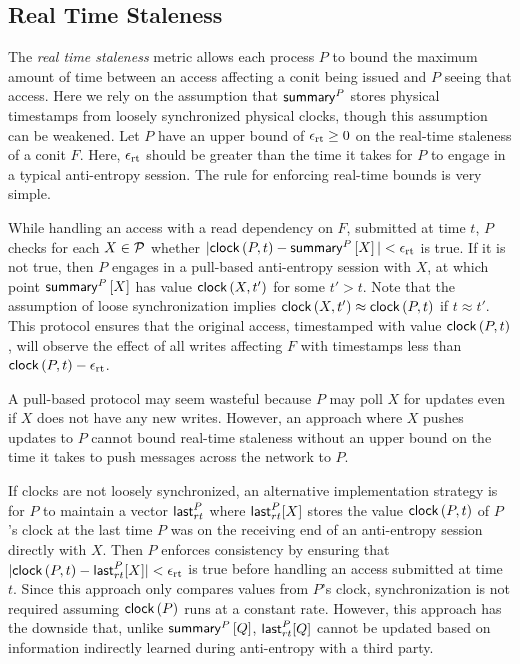 \documentclass[]             %
{NASA}                       %
\theoremstyle{definition}
\begin{document}
\subsection{Real Time Staleness}
\label{ssec:conit-real-time-consistency}
The \emph{real time staleness} metric allows each process $P$ to bound
the maximum amount of time between an access affecting a conit being
issued and $P$ seeing that access. Here we rely on the assumption that
$\mathsf{summary}^{P}$ stores physical timestamps from loosely synchronized
physical clocks, though this assumption can be weakened. Let $P$ have
an upper bound of $\epsilon_{\textrm{rt}} \geq 0$ on the real-time staleness of a conit
$F$. Here, $\epsilon_{\textrm{rt}}$ should be greater than the time it takes for $P$ to
engage in a typical anti-entropy session. The rule for enforcing
real-time bounds is very simple.

While handling an access with a read dependency on $F$, submitted at
time $t$, $P$ checks for each $X \in \mathcal{P}$ whether
$|\mathsf{clock}\left(P, t\right) - \mathsf{summary}^{P}\left[X\right]| < \epsilon_{\textrm{rt}}$ is true. If it is not true,
then $P$ engages in a pull-based anti-entropy session with $X$, at
which point $\mathsf{summary}^{P}\left[X\right]$ has value $\mathsf{clock}\left(X, t'\right)$ for some
$t' > t$. Note that the assumption of loose synchronization implies
$\mathsf{clock}\left(X, t'\right) \approx \mathsf{clock}\left(P, t\right)$ if $t \approx t'$. This protocol
ensures that the original access, timestamped with value
$\mathsf{clock}\left(P,t\right)$, will observe the effect of all writes affecting $F$
with timestamps less than $\mathsf{clock}\left(P,t\right) - \epsilon_{\textrm{rt}}$.

A pull-based protocol may seem wasteful because $P$ may poll $X$ for
updates even if $X$ does not have any new writes. However, an approach
where $X$ pushes updates to $P$ cannot bound real-time staleness
without an upper bound on the time it takes to push messages across
the network to $P$.

If clocks are not loosely synchronized, an alternative implementation
strategy is for $P$ to maintain a vector $\mathsf{last}_{rt}^{P}{}$ where
$\mathsf{last}_{rt}^{P}[X]$ stores the value $\mathsf{clock}\left(P,t\right)$ of $P$'s clock at the
last time $P$ was on the receiving end of an anti-entropy session
directly with $X$. Then $P$ enforces consistency by ensuring that
$|\mathsf{clock}\left(P, t\right) - \mathsf{last}_{rt}^{P}{[X]}| < \epsilon_{\textrm{rt}}$ is true before handling an
access submitted at time $t$. Since this approach only compares values
from $P$'s clock, synchronization is not required assuming $\mathsf{clock}\left(P\right)$
runs at a constant rate. However, this approach has the downside that,
unlike $\mathsf{summary}^{P}\left[Q\right]$, $\mathsf{last}_{rt}^{P}[Q]$ cannot be updated based on
information indirectly learned during anti-entropy with a third
party.
\end{document}
